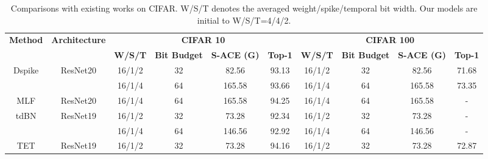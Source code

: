 \begin{table}[t]
\centering
\caption{Comparisons with existing works on CIFAR. W/S/T denotes the averaged weight/spike/temporal bit width. Our models are initial to W/S/T=4/4/2.}
\label{tab:comparison on cifar}
\begin{adjustbox}{max width=0.9\textwidth}
\begin{threeparttable}
\begin{tabular}{cccccccccc}
\toprule
\multirow{2}{*}{\textbf{Method}} & \multirow{2}{*}{\textbf{Architecture}} & \multicolumn{4}{c}{\textbf{CIFAR 10}}                                                 & \multicolumn{4}{c}{\textbf{CIFAR 100}}                                        \\ \cmidrule(r){3-6} \cmidrule(r){7-10}                                  &                                        & \textbf{W/S/T}       & \textbf{Bit Budget} & \textbf{S-ACE (G)}          & \textbf{Top-1} & \textbf{W/S/T}          & \textbf{Bit Budget} & \textbf{S-ACE (G)}          & \textbf{Top-1} \\ \midrule
\multirow{2}{*}{Dspike \cite{li2021differentiable} }         & \multirow{2}{*}{ResNet20}     & 16/1/2               & 32            & 82.56          & 93.13          & 16/1/2         & 32         & 82.56          & 71.68          \\
                                 &                               & 16/1/4               & 64            & 165.58         & 93.66          & 16/1/4         & 64         & 165.58         & 73.35          \\ 
MLF \cite{fengmulti}                              & ResNet20                      & 16/1/4               & 64            & 165.58         & 94.25          & 16/1/4         & 64         & 165.58         & -              \\ 
\multirow{2}{*}{tdBN \cite{zheng2021going}}           & \multirow{2}{*}{ResNet19}     & 16/1/2               & 32            & 73.28          & 92.34          & 16/1/2         & 32         & 73.28          & -              \\
                                 &                               & 16/1/4               & 64            & 146.56         & 92.92          & 16/1/4         & 64         & 146.56         & -              \\ 
\multirow{2}{*}{TET \cite{deng2021temporal}}           & \multirow{2}{*}{ResNet19}     & 16/1/2               & 32            & 73.28          & 94.16          & 16/1/2         & 32         & 73.28          & 72.87          \\

\end{tabular}
\end{threeparttable}
\end{adjustbox}
\end{table}

